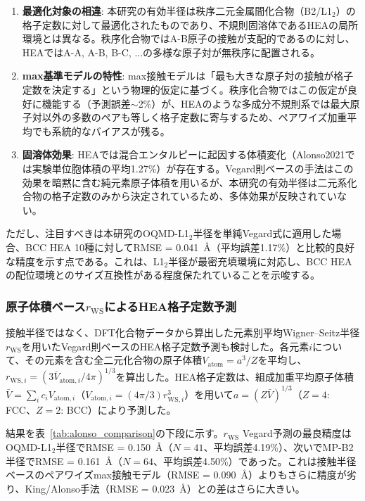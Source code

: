 \documentclass[a4paper,10pt,5p]{elsarticle}
\begin{document}
\begin{enumerate}
\setlength{\parskip}{0cm}
\setlength{\itemsep}{0cm}
    \item \textbf{最適化対象の相違}: 本研究の有効半径は秩序二元金属間化合物（B2/L1$_2$）の格子定数に対して最適化されたものであり、不規則固溶体であるHEAの局所環境とは異なる。秩序化合物ではA-B原子の接触が支配的であるのに対し、HEAではA-A, A-B, B-C, ...の多様な原子対が無秩序に配置される。
    \item \textbf{max基準モデルの特性}: max接触モデルは「最も大きな原子対の接触が格子定数を決定する」という物理的仮定に基づく。秩序化合物ではこの仮定が良好に機能する（予測誤差$\sim$2\%）が、HEAのような多成分不規則系では最大原子対以外の多数のペアも等しく格子定数に寄与するため、ペアワイズ加重平均でも系統的なバイアスが残る。
    \item \textbf{固溶体効果}: HEAでは混合エンタルピーに起因する体積変化（Alonso2021では実験単位胞体積の平均1.27\%）が存在する。Vegard則ベースの手法はこの効果を暗黙に含む純元素原子体積を用いるが、本研究の有効半径は二元系化合物の格子定数のみから決定されているため、多体効果が反映されていない。
\end{enumerate}

ただし、注目すべきは本研究のOQMD-L1$_2$半径を単純Vegard式に適用した場合、BCC HEA 10種に対してRMSE = 0.041~\AA（平均誤差1.17\%）と比較的良好な精度を示す点である。これは、L1$_2$半径が最密充填環境に対応し、BCC HEAの配位環境とのサイズ互換性がある程度保たれていることを示唆する。

\subsubsection{原子体積ベース$r_\mathrm{WS}$によるHEA格子定数予測}
接触半径ではなく、DFT化合物データから算出した元素別平均Wigner--Seitz半径$r_\mathrm{WS}$を用いたVegard則ベースのHEA格子定数予測も検討した。各元素$i$について、その元素を含む全二元化合物の原子体積$V_\mathrm{atom} = a^3/Z$を平均し、$r_{\mathrm{WS},i} = (3\bar{V}_{\mathrm{atom},i}/4\pi)^{1/3}$を算出した。HEA格子定数は、組成加重平均原子体積$\bar{V} = \sum_i c_i V_{\mathrm{atom},i}$（$V_{\mathrm{atom},i} = (4\pi/3)r_{\mathrm{WS},i}^3$）を用いて$a = (Z\bar{V})^{1/3}$（$Z = 4$: FCC、$Z = 2$: BCC）により予測した。

結果を表~\ref{tab:alonso_comparison}の下段に示す。$r_\mathrm{WS}$ Vegard予測の最良精度はOQMD-L1$_2$半径でRMSE = 0.150~\AA（$N = 41$、平均誤差4.19\%）、次いでMP-B2半径でRMSE = 0.161~\AA（$N = 64$、平均誤差4.50\%）であった。これは接触半径ベースのペアワイズmax接触モデル（RMSE = 0.090~\AA）よりもさらに精度が劣り、King/Alonso手法（RMSE = 0.023~\AA）との差はさらに大きい。
\end{document}
